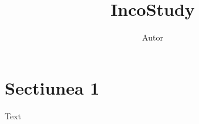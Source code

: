 \documentclass{article}
\title{IncoStudy}
\author{Autor}
\date{}
\begin{document}
  \maketitle
  \tableofcontents
  
  \section{Sectiunea 1}
	  Text
  
  
\end{document}
